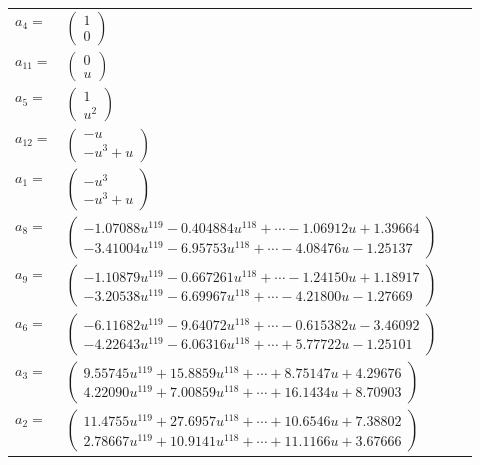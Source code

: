 \documentclass[1p]{elsarticle_modified}
\theoremstyle{definition}
\begin{document}
\begin{tabular}{m{7pt} m{180pt} m{7pt} m{180pt} }
\flushright $a_{4}=$&$\begin{pmatrix}1\\0\end{pmatrix}$ \\
\flushright $a_{11}=$&$\begin{pmatrix}0\\u\end{pmatrix}$ \\
\flushright $a_{5}=$&$\begin{pmatrix}1\\u^2\end{pmatrix}$ \\
\flushright $a_{12}=$&$\begin{pmatrix}- u\\- u^3+u\end{pmatrix}$ \\
\flushright $a_{1}=$&$\begin{pmatrix}- u^3\\- u^3+u\end{pmatrix}$ \\
\flushright $a_{8}=$&$\begin{pmatrix}-1.07088 u^{119}-0.404884 u^{118}+\cdots-1.06912 u+1.39664\\-3.41004 u^{119}-6.95753 u^{118}+\cdots-4.08476 u-1.25137\end{pmatrix}$ \\
\flushright $a_{9}=$&$\begin{pmatrix}-1.10879 u^{119}-0.667261 u^{118}+\cdots-1.24150 u+1.18917\\-3.20538 u^{119}-6.69967 u^{118}+\cdots-4.21800 u-1.27669\end{pmatrix}$ \\
\flushright $a_{6}=$&$\begin{pmatrix}-6.11682 u^{119}-9.64072 u^{118}+\cdots-0.615382 u-3.46092\\-4.22643 u^{119}-6.06316 u^{118}+\cdots+5.77722 u-1.25101\end{pmatrix}$ \\
\flushright $a_{3}=$&$\begin{pmatrix}9.55745 u^{119}+15.8859 u^{118}+\cdots+8.75147 u+4.29676\\4.22090 u^{119}+7.00859 u^{118}+\cdots+16.1434 u+8.70903\end{pmatrix}$ \\
\flushright $a_{2}=$&$\begin{pmatrix}11.4755 u^{119}+27.6957 u^{118}+\cdots+10.6546 u+7.38802\\2.78667 u^{119}+10.9141 u^{118}+\cdots+11.1166 u+3.67666\end{pmatrix}$ \\

\end{tabular}
\end{document}

